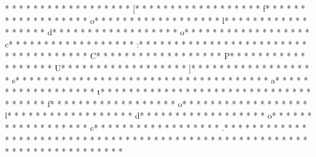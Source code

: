 * * *  * * *  * * *  *  * * *  *  * * *  * [* * *  * * *  * * *  *  * * *  *  * * *  * f* * *  * * *  * * *  *  * * *  *  * * *  * o* * *  * * *  * * *  *  * * *  *  * * *  * l* * *  * * *  * * *  *  * * *  *  * * *  * d* * *  * * *  * * *  *  * * *  *  * * *  * o* * *  * * *  * * *  *  * * *  *  * * *  * c* * *  * * *  * * *  *  * * *  *  * * *  * :* * *  * * *  * * *  *  * * *  *  * * *  *  * * *  * * *  * * *  *  * * *  *  * * *  * C* * *  * * *  * * *  *  * * *  *  * * *  * P* * *  * * *  * * *  *  * * *  *  * * *  * U* * *  * * *  * * *  *  * * *  *  * * *  * ]* * *  * * *  * * *  *  * * *  *  * * *  * s* * *  * * *  * * *  *  * * *  *  * * *  *  * * *  * * *  * * *  *  * * *  *  * * *  * a* * *  * * *  * * *  *  * * *  *  * * *  * t* * *  * * *  * * *  *  * * *  *  * * *  *  * * *  * * *  * * *  *  * * *  *  * * *  * f* * *  * * *  * * *  *  * * *  *  * * *  * o* * *  * * *  * * *  *  * * *  *  * * *  * l* * *  * * *  * * *  *  * * *  *  * * *  * d* * *  * * *  * * *  *  * * *  *  * * *  * o* * *  * * *  * * *  *  * * *  *  * * *  * c* * *  * * *  * * *  *  * * *  *  * * *  * .* * *  * * *  * * *  *  * * *  *  * * *  *  * * *  * * *  * * *  *  * * *  *  * * *  *  * * *  * * *  * * *  *  * * *  *  * * *  * 
* * *  * * *  * * *  *  * * *  *  * * *  * 
